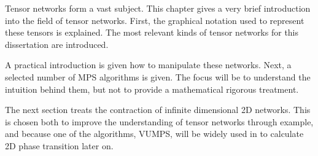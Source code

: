 
Tensor networks form a vast subject. This chapter gives a very brief introduction into the field of tensor networks. First, the graphical notation used to represent these tensors is explained. The most relevant kinds of tensor networks for this dissertation are introduced.

A practical introduction is given how to manipulate these networks. Next, a selected number of MPS algorithms is given. The focus will be to understand the intuition behind them, but not to  provide a mathematical rigorous treatment.

The next section treats the contraction of infinite dimensional 2D networks. This is chosen both to improve the understanding of tensor networks through example, and because one of the algorithms, VUMPS, will be widely used in to calculate 2D phase transition later on.